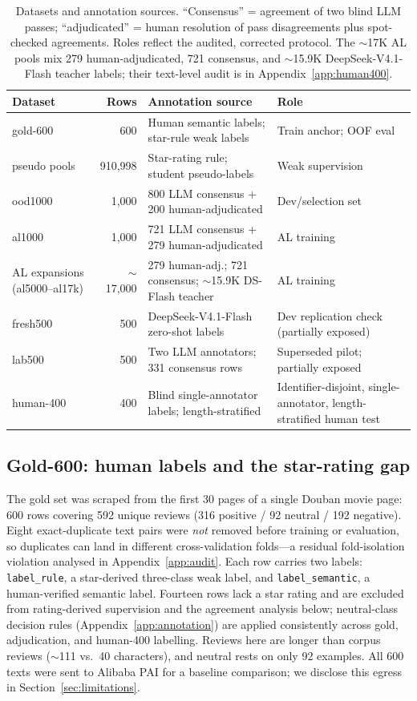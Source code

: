 \begin{table}[t]
\centering
\scriptsize
\setlength{\tabcolsep}{2pt}
\caption{Datasets and annotation sources. ``Consensus'' = agreement of
two blind LLM passes; ``adjudicated'' = human resolution of pass
disagreements plus spot-checked agreements. Roles reflect the audited,
corrected protocol. The $\sim$17K AL pools mix 279 human-adjudicated,
721 consensus, and $\sim$15.9K DeepSeek-V4.1-Flash teacher labels;
their text-level audit is in Appendix~\ref{app:human400}.}
\label{tab:datasets}
\begin{tabular}{@{}p{1.5cm}r p{2.9cm} p{1.6cm}@{}}
\toprule
Dataset & Rows & Annotation source & Role \\
\midrule
gold-600 & 600 & Human semantic labels; star-rule weak labels & Train anchor; OOF eval \\
pseudo pools & 910{,}998 & Star-rating rule; student pseudo-labels & Weak supervision \\
ood1000 & 1{,}000 & 800 LLM consensus + 200 human-adjudicated & Dev/selection set \\
al1000 & 1{,}000 & 721 LLM consensus + 279 human-adjudicated & AL training \\
AL expansions (al5000--al17k) & $\sim$17{,}000 & 279 human-adj.; 721 consensus; $\sim$15.9K DS-Flash teacher & AL training \\
fresh500 & 500 & DeepSeek-V4.1-Flash zero-shot labels & Dev replication check (partially exposed) \\
lab500 & 500 & Two LLM annotators; 331 consensus rows & Superseded pilot; partially exposed \\
human-400 & 400 & Blind single-annotator labels; length-stratified & Identifier-disjoint, single-annotator, length-stratified human test \\
\bottomrule
\end{tabular}
\end{table}

\subsection{Gold-600: human labels and the star-rating gap}

The gold set was scraped from the first 30 pages of a single Douban
movie page: 600 rows covering 592 unique reviews (316 positive / 92
neutral / 192 negative). Eight exact-duplicate text pairs were
\emph{not} removed before training or evaluation, so duplicates can
land in different cross-validation folds---a residual fold-isolation
violation analysed in Appendix~\ref{app:audit}. Each row carries two
labels: \texttt{label\_rule}, a star-derived three-class weak label,
and \texttt{label\_semantic}, a human-verified semantic label.
Fourteen rows lack a star rating and are excluded from rating-derived
supervision and the agreement analysis below; neutral-class decision
rules (Appendix~\ref{app:annotation}) are applied consistently across
gold, adjudication, and human-400 labelling. Reviews here are longer
than corpus reviews ($\sim$111 vs.\ 40 characters), and neutral rests
on only 92 examples. All 600 texts were sent to Alibaba PAI for a
baseline comparison; we disclose this egress in
Section~\ref{sec:limitations}.

